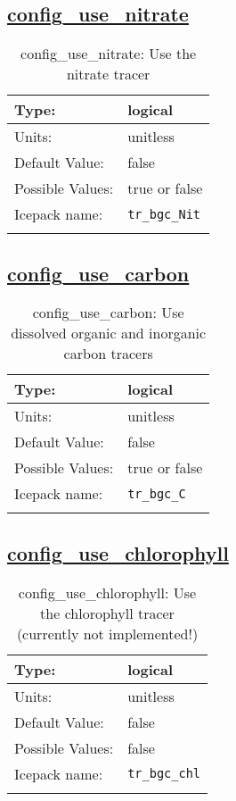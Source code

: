 \subsection[config\_use\_nitrate]{\hyperref[sec:nm_tab_biogeochemistry]{config\_use\_nitrate}}
\label{subsec:nm_sec_config_use_nitrate}
\begin{center}
\begin{longtable}{| p{2.0in} || p{4.0in} |}
    \hline
    Type: & logical \\
    \hline
    Units: & \si{unitless} \\
    \hline
    Default Value: & false \\
    \hline
    Possible Values: & true or false \\
    \hline
    Icepack name: & \verb+tr_bgc_Nit+ \\
    \hline
    \caption{config\_use\_nitrate: Use the nitrate tracer}
\end{longtable}
\end{center}
\subsection[config\_use\_carbon]{\hyperref[sec:nm_tab_biogeochemistry]{config\_use\_carbon}}
\label{subsec:nm_sec_config_use_carbon}
\begin{center}
\begin{longtable}{| p{2.0in} || p{4.0in} |}
    \hline
    Type: & logical \\
    \hline
    Units: & \si{unitless} \\
    \hline
    Default Value: & false \\
    \hline
    Possible Values: & true or false \\
    \hline
    Icepack name: & \verb+tr_bgc_C+ \\
    \hline
    \caption{config\_use\_carbon: Use dissolved organic and inorganic carbon tracers}
\end{longtable}
\end{center}
\subsection[config\_use\_chlorophyll]{\hyperref[sec:nm_tab_biogeochemistry]{config\_use\_chlorophyll}}
\label{subsec:nm_sec_config_use_chlorophyll}
\begin{center}
\begin{longtable}{| p{2.0in} || p{4.0in} |}
    \hline
    Type: & logical \\
    \hline
    Units: & \si{unitless} \\
    \hline
    Default Value: & false \\
    \hline
    Possible Values: & false \\
    \hline
    Icepack name: & \verb+tr_bgc_chl+ \\
    \hline
    \caption{config\_use\_chlorophyll: Use the chlorophyll tracer (currently not implemented!)}
\end{longtable}
\end{center}
